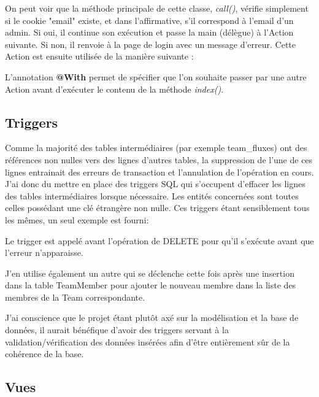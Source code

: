 \documentclass[french]{article}
\begin{document}


On peut voir que la méthode principale de cette classe, \textit{call()}, vérifie simplement si le cookie "email" existe, et dans l'affirmative, s'il correspond à l'email d'un admin. Si oui, il continue son exécution et passe la main (délègue) à l'Action suivante. Si non, il renvoie à la page de login avec un message d'erreur. Cette Action est ensuite utilisée de la manière suivante :



L'annotation \textbf{@With} permet de spécifier que l'on souhaite passer par une autre Action avant d'exécuter le contenu de la méthode \textit{index()}.

\newpage
\subsection{Triggers}

Comme la majorité des tables intermédiaires (par exemple team\_fluxes) ont des références non nulles vers des lignes d'autres tables, la suppression de l'une de ces lignes entrainait des erreurs de transaction et l'annulation de l'opération en cours. J'ai donc du mettre en place des triggers SQL qui s'occupent d'effacer les lignes des tables intermédiaires lorsque nécessaire. Les entités concernées sont toutes celles possédant une clé étrangère non nulle. Ces triggers étant sensiblement tous les mêmes, un seul exemple est fourni:



Le trigger est appelé avant l'opération de DELETE pour qu'il s'exécute avant que l'erreur n'apparaisse. 

J'en utilise également un autre qui se déclenche cette fois après une insertion dans la table TeamMember pour ajouter le nouveau membre dans la liste des membres de la Team correspondante.\newline

J'ai conscience que le projet étant plutôt axé sur la modélisation et la base de données, il aurait bénéfique d'avoir des triggers servant à la validation/vérification des données insérées afin d'être entièrement sûr de la cohérence de la base.

\newpage
\subsection{Vues}
\end{document}
